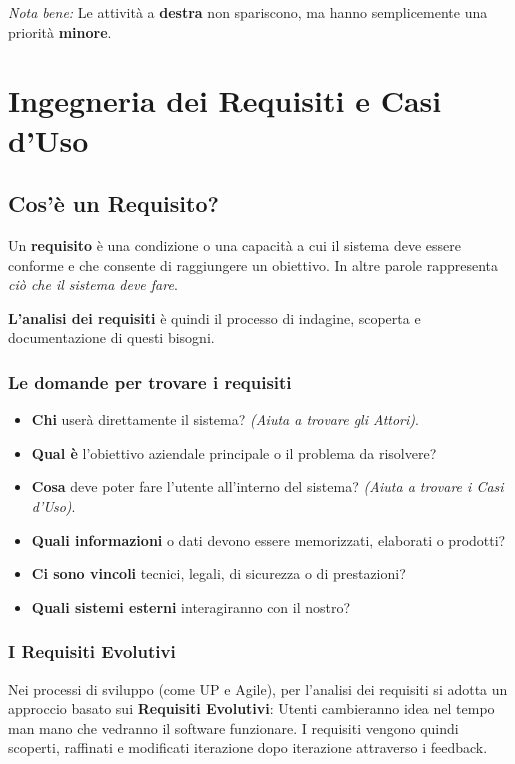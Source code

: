 \documentclass[10pt, a4paper]{article}
\begin{document}
\textit{Nota bene:} Le attività a \textbf{destra} non spariscono, ma hanno semplicemente una priorità \textbf{minore}.

\section{Ingegneria dei Requisiti e Casi d'Uso}

\subsection{Cos'è un Requisito?}
Un \textbf{requisito} è una condizione o una capacità a cui il sistema deve essere conforme e che consente di raggiungere un obiettivo. In altre parole rappresenta \textit{ciò che il sistema deve fare}.

\textbf{L'analisi dei requisiti} è quindi il processo di indagine, scoperta e documentazione di questi bisogni.

\subsubsection*{Le domande per trovare i requisiti}
\begin{itemize}
    \item \textbf{Chi} userà direttamente il sistema? \textit{(Aiuta a trovare gli Attori)}.
    \item \textbf{Qual è} l'obiettivo aziendale principale o il problema da risolvere?
    \item \textbf{Cosa} deve poter fare l'utente all'interno del sistema? \textit{(Aiuta a trovare i Casi d'Uso)}.
    \item \textbf{Quali informazioni} o dati devono essere memorizzati, elaborati o prodotti?
    \item \textbf{Ci sono vincoli} tecnici, legali, di sicurezza o di prestazioni?
    \item \textbf{Quali sistemi esterni} interagiranno con il nostro?
\end{itemize}

\subsubsection*{I Requisiti Evolutivi}
Nei processi di sviluppo (come UP e Agile), per l'analisi dei requisiti si adotta un approccio basato sui \textbf{Requisiti Evolutivi}: Utenti cambieranno idea nel tempo man mano che vedranno il software funzionare. I requisiti vengono quindi scoperti, raffinati e modificati iterazione dopo iterazione attraverso i feedback.
\end{document}
